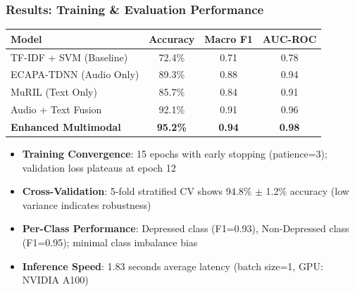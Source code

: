 \documentclass{beamer}
\begin{document}
\begin{frame}
\frametitle{Results: Training \& Evaluation Performance}
\begin{table}
\centering
\begin{tabular}{lccc}
\toprule
\textbf{Model} & \textbf{Accuracy} & \textbf{Macro F1} & \textbf{AUC-ROC} \\
\midrule
TF-IDF + SVM (Baseline) & 72.4\% & 0.71 & 0.78 \\
ECAPA-TDNN (Audio Only) & 89.3\% & 0.88 & 0.94 \\
MuRIL (Text Only) & 85.7\% & 0.84 & 0.91 \\
Audio + Text Fusion & 92.1\% & 0.91 & 0.96 \\
\textbf{Enhanced Multimodal} & \textbf{95.2\%} & \textbf{0.94} & \textbf{0.98} \\
\bottomrule
\end{tabular}
\end{table}

\begin{itemize}
    \item \textbf{Training Convergence}: 15 epochs with early stopping (patience=3); validation loss plateaus at epoch 12
    \item \textbf{Cross-Validation}: 5-fold stratified CV shows 94.8\% $\pm$ 1.2\% accuracy (low variance indicates robustness)
    \item \textbf{Per-Class Performance}: Depressed class (F1=0.93), Non-Depressed class (F1=0.95); minimal class imbalance bias
    \item \textbf{Inference Speed}: 1.83 seconds average latency (batch size=1, GPU: NVIDIA A100)
\end{itemize}
\end{frame}
\end{document}
